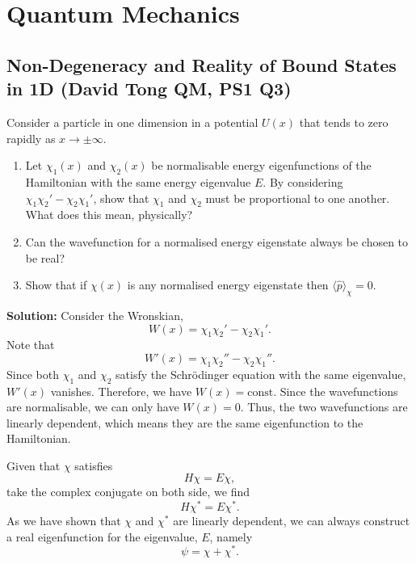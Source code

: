 \section{Quantum Mechanics}
\subsection{Non-Degeneracy and Reality of Bound States in 1D (David Tong QM, PS1 Q3)}
\label{sec:bound-states}

Consider a particle in one dimension in a potential $U(x)$ that tends to zero
rapidly as $x \to \pm\infty$.

\begin{enumerate}
    \item Let $\chi_1(x)$ and $\chi_2(x)$ be normalisable energy eigenfunctions of the
    Hamiltonian with the same energy eigenvalue $E$. By considering
    $\chi_1 \chi_2' - \chi_2 \chi_1'$,
    show that $\chi_1$ and $\chi_2$ must be proportional to one another.
    What does this mean, physically?
    

  \item Can the wavefunction for a normalised energy eigenstate always be chosen to be
    real?

  \item Show that if $\chi(x)$ is any normalised energy eigenstate then
    $\langle \hat{p} \rangle_\chi = 0$.
\end{enumerate}
\textbf{Solution:} Consider the Wronskian, 
\begin{equation}
    W(x) = \chi_1\chi_2'-\chi_2\chi_1'.
\end{equation}
Note that 
\begin{equation}
    W'(x) = \chi_1\chi_2''-\chi_2\chi_1''.
\end{equation}
Since both $\chi_1$ and $\chi_2$ satisfy the Schrödinger equation with the same eigenvalue, $W'(x)$ vanishes. Therefore, we have $W(x) = \text{const}$. Since the wavefunctions are normalisable, we can only have $W(x)=0$. Thus, the two wavefunctions are linearly dependent, which means they are the same eigenfunction to the Hamiltonian.

Given that $\chi$ satisfies
\begin{equation}
    H\chi=E\chi,
\end{equation}
take the complex conjugate on both side, we find
\begin{equation}
    H\chi^*=E\chi^*.
\end{equation}
As we have shown that $\chi$ and $\chi^*$ are linearly dependent, we can always construct a real eigenfunction for the eigenvalue, $E$, namely
\begin{equation}
    \psi = \chi + \chi^*.
\end{equation}


